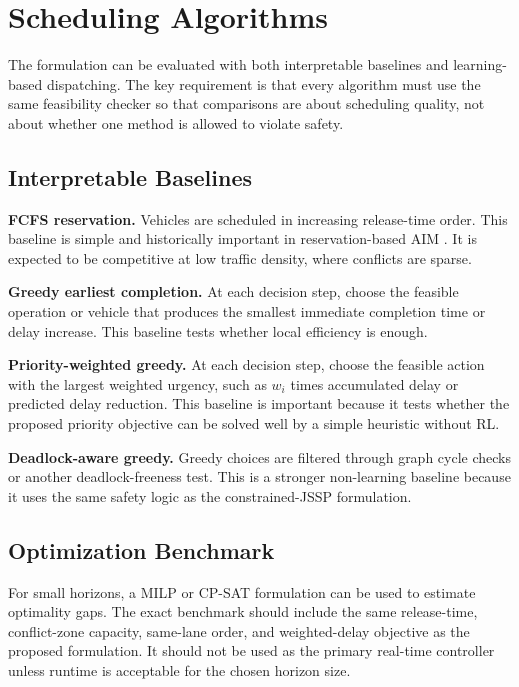 \section{Scheduling Algorithms}

The formulation can be evaluated with both interpretable baselines and learning-based dispatching. The key requirement is that every algorithm must use the same feasibility checker so that comparisons are about scheduling quality, not about whether one method is allowed to violate safety.

\subsection{Interpretable Baselines}

\textbf{FCFS reservation.} Vehicles are scheduled in increasing release-time order. This baseline is simple and historically important in reservation-based AIM \cite{dresner2008multiagent}. It is expected to be competitive at low traffic density, where conflicts are sparse.

\textbf{Greedy earliest completion.} At each decision step, choose the feasible operation or vehicle that produces the smallest immediate completion time or delay increase. This baseline tests whether local efficiency is enough.

\textbf{Priority-weighted greedy.} At each decision step, choose the feasible action with the largest weighted urgency, such as $w_i$ times accumulated delay or predicted delay reduction. This baseline is important because it tests whether the proposed priority objective can be solved well by a simple heuristic without RL.

\textbf{Deadlock-aware greedy.} Greedy choices are filtered through graph cycle checks or another deadlock-freeness test. This is a stronger non-learning baseline because it uses the same safety logic as the constrained-JSSP formulation.

\subsection{Optimization Benchmark}

For small horizons, a MILP or CP-SAT formulation can be used to estimate optimality gaps. The exact benchmark should include the same release-time, conflict-zone capacity, same-lane order, and weighted-delay objective as the proposed formulation. It should not be used as the primary real-time controller unless runtime is acceptable for the chosen horizon size.

